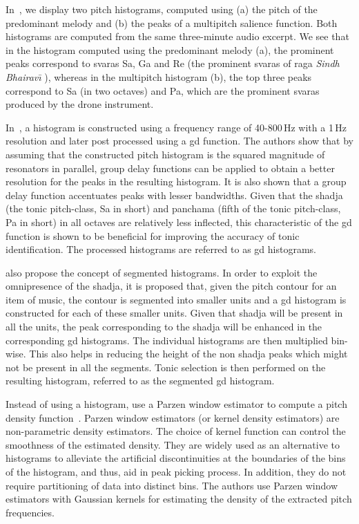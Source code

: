 In~, we display two pitch histograms, computed using (a) the pitch of the predominant melody and (b) the peaks of a multipitch salience function. Both histograms are computed from the same three-minute audio excerpt. We see that in the histogram computed using the predominant melody (a), the prominent peaks correspond to \glspl{svara} Sa, Ga and Re (the prominent \glspl{svara} of \gls{raga} \textit{Sindh Bhairav\={\i}} ), whereas in the multipitch histogram (b), the top three peaks correspond to Sa (in two octaves) and Pa, which are the prominent \glspl{svara} produced by the drone instrument. 

In~\cite{Ashwin_Istanbul2012}, a histogram is constructed using a frequency range of 40-800\,Hz with a 1\,Hz resolution and later post processed using a \gls{gd} function. The authors show that by assuming that the constructed pitch histogram is the squared magnitude of resonators in parallel, group delay functions can be applied to obtain a better resolution for the peaks in the resulting histogram. It is also shown that a group delay function accentuates peaks with lesser bandwidths. Given that the \gls{shadja} (the tonic pitch-class, Sa in short) and \gls{panchama} (fifth of the tonic pitch-class, Pa in short) in all octaves are relatively less inflected, this characteristic of the \gls{gd} function is shown to be beneficial for improving the accuracy of tonic identification. The processed histograms are referred to as \gls{gd} histograms.

\cite{Ashwin_Istanbul2012} also propose the concept of segmented histograms. In order to exploit the omnipresence of the \gls{shadja},  it is proposed that, given the pitch contour for an item of music, the contour is segmented into smaller units and a \gls{gd} histogram is constructed for each of these smaller units. Given that \gls{shadja} will be present in all the units, the peak corresponding to the \gls{shadja} will be enhanced in the corresponding \gls{gd} histograms. The individual histograms are then multiplied bin-wise. This also helps in reducing the height of the non \gls{shadja} peaks which might not be present in all the segments. Tonic selection is then performed on the resulting histogram, referred to as the segmented \gls{gd} histogram.

Instead of using a histogram, \cite{ranjani2011carnatic} use a Parzen window estimator to compute a pitch density function~\citep{Bishop,DudaHart2000}. Parzen window estimators (or kernel density estimators) are non-parametric density estimators. The choice of kernel function can control the smoothness of the estimated density. They are widely used as an alternative to histograms to alleviate the artificial discontinuities at the boundaries of the bins of the histogram, and thus, aid in peak picking process. In addition, they do not require partitioning of data into distinct bins. The authors use Parzen window estimators with Gaussian kernels for estimating the density of the extracted pitch frequencies.


